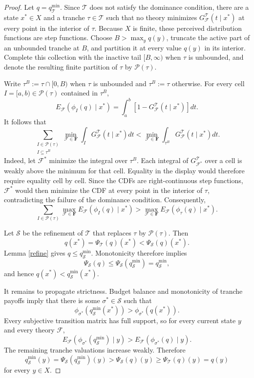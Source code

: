 \documentclass[11pt]{article}
\theoremstyle{plain}
\begin{document}
\begin{proof}
Let $q=q_{\mathcal{T}}^{\min}$. Since $\mathcal{T}$ does not satisfy the dominance condition, there are a state $x^*\in X$ and a tranche $\tau\in\mathcal{T}$ such that no theory minimizes $G^\mathcal{T}_{\mathcal{F}}(t\mid x^*)$ at every point in the interior of $\tau$. Because $X$ is finite, these perceived distribution functions are step functions. Choose $B>\max_yq(y)$, truncate the active part of an unbounded tranche at $B$, and partition it at every value $q(y)$ in its interior. Complete this collection with the inactive tail $[B,\infty)$ when $\tau$ is unbounded, and denote the resulting finite partition of $\tau$ by $\mathcal{P}(\tau)$.

Write $\tau^B:=\tau\cap[0,B)$ when $\tau$ is unbounded and $\tau^B:=\tau$ otherwise.
For every cell $I=[a,b)\in\mathcal{P}(\tau)$ contained in $\tau^B$,
\[
E_{\mathcal{F}}\left(\phi_I(q)\mid x^*\right)
=
\int_a^b\left[1-G^\mathcal{T}_{\mathcal{F}}(t\mid x^*)\right]dt.
\]
It follows that
\[
\sum_{\substack{I\in\mathcal{P}(\tau)\\ I\subseteq\tau^B}}
\min_{\mathcal{F}\in\mathbf{F}}
\int_I G^\mathcal{T}_{\mathcal{F}}(t\mid x^*)dt
<
\min_{\mathcal{F}\in\mathbf{F}}
\int_{\tau^B} G^\mathcal{T}_{\mathcal{F}}(t\mid x^*)dt.
\]
Indeed, let $\mathcal{F}^*$ minimize the integral over $\tau^B$. Each integral of $G^\mathcal{T}_{\mathcal{F}^*}$ over a cell is weakly above the minimum for that cell. Equality in the display would therefore require equality cell by cell. Since the CDFs are right-continuous step functions, $\mathcal{F}^*$ would then minimize the CDF at every point in the interior of $\tau$, contradicting the failure of the dominance condition. Consequently,
\[
\sum_{I\in\mathcal{P}(\tau)}
\max_{\mathcal{F}\in\mathbf{F}}
E_{\mathcal{F}}\left(\phi_I(q)\mid x^*\right)
>
\max_{\mathcal{F}\in\mathbf{F}}
E_{\mathcal{F}}\left(\phi_\tau(q)\mid x^*\right).
\]

Let $\mathcal{S}$ be the refinement of $\mathcal{T}$ that replaces $\tau$ by $\mathcal{P}(\tau)$. Then
\[
q(x^*)
=
\Psi_{\mathcal{T}}(q)(x^*)
<
\Psi_{\mathcal{S}}(q)(x^*).
\]
Lemma \ref{refine} gives $q\leq q_{\mathcal{S}}^{\min}$. Monotonicity therefore implies
\[
\Psi_{\mathcal{S}}(q)
\leq
\Psi_{\mathcal{S}}(q_{\mathcal{S}}^{\min})
=q_{\mathcal{S}}^{\min},
\]
and hence $q(x^*)<q_{\mathcal{S}}^{\min}(x^*)$.

It remains to propagate strictness. Budget balance and monotonicity of tranche payoffs imply that there is some $\sigma^*\in\mathcal{S}$ such that
\[
\phi_{\sigma^*}(q_{\mathcal{S}}^{\min}(x^*))
>
\phi_{\sigma^*}(q(x^*)).
\]
Every subjective transition matrix has full support, so for every current state $y$ and every theory $\mathcal{F}$,
\[
E_{\mathcal{F}}\left(\phi_{\sigma^*}(q_{\mathcal{S}}^{\min})\mid y\right)
>
E_{\mathcal{F}}\left(\phi_{\sigma^*}(q)\mid y\right).
\]
The remaining tranche valuations increase weakly. Therefore
\[
q_{\mathcal{S}}^{\min}(y)
=\Psi_{\mathcal{S}}(q_{\mathcal{S}}^{\min})(y)
>\Psi_{\mathcal{S}}(q)(y)
\geq\Psi_{\mathcal{T}}(q)(y)
=q(y)
\]
for every $y\in X$.
\end{proof}
\end{document}
